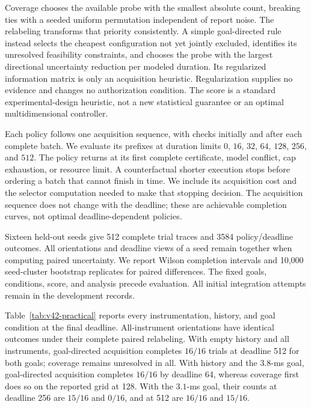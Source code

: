Coverage chooses the available probe with the smallest absolute count,
breaking ties with a seeded uniform permutation independent of report noise.
The relabeling transforms that priority consistently. A simple goal-directed
rule instead selects the cheapest configuration not yet jointly excluded,
identifies its unresolved feasibility constraints, and chooses the probe
with the largest directional uncertainty reduction per modeled duration.
Its regularized information matrix is only an acquisition heuristic.
Regularization supplies no evidence and changes no authorization condition.
The score is a standard experimental-design heuristic, not a new statistical
guarantee or an optimal multidimensional controller.

Each policy follows one acquisition sequence, with checks initially and
after each complete batch. We evaluate its prefixes at duration limits
$0$, $16$, $32$, $64$, $128$, $256$, and $512$. The policy returns at its
first complete certificate, model conflict, cap exhaustion, or resource
limit. A counterfactual shorter execution stops before ordering a batch
that cannot finish in time. We include its acquisition cost and the selector
computation needed to make that stopping decision. The acquisition sequence
does not change with the deadline; these are achievable completion curves,
not optimal deadline-dependent policies.

Sixteen held-out seeds give 512 complete trial traces and 3584
policy/deadline outcomes. All orientations and deadline views of a seed
remain together when computing paired uncertainty. We report Wilson
completion intervals and 10,000 seed-cluster bootstrap replicates for paired
differences. The fixed goals, conditions, score, and analysis precede
evaluation. All initial integration attempts remain in the development
records.

Table~\ref{tab:v42-practical} reports every instrumentation, history,
and goal condition at the final deadline. All-instrument orientations have
identical outcomes under their complete paired relabeling. With empty
history and all instruments, goal-directed acquisition completes $16/16$
trials at deadline 512 for both goals; coverage remains unresolved in all.
With history and the $3.8$-ms goal, goal-directed acquisition completes
$16/16$ by deadline 64, whereas coverage first does so on the reported
grid at 128. With the $3.1$-ms goal, their counts at deadline 256 are
$15/16$ and $0/16$, and at 512 are $16/16$ and $15/16$.

